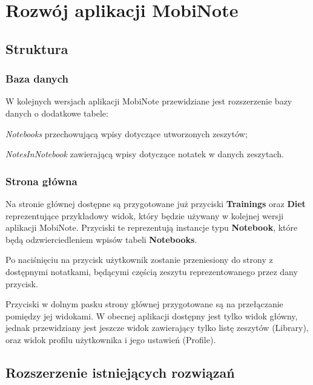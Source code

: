 

\chapter{Rozwój aplikacji MobiNote}
\label{ch:rozwoj}

\section{Struktura}

\subsection{Baza danych}

W kolejnych wersjach aplikacji MobiNote przewidziane jest rozszerzenie bazy danych o dodatkowe tabele:
\begin{compactitem}
    \item \textit{Notebooks} przechowującą wpisy dotyczące utworzonych zeszytów;
    \item \textit{NotesInNotebook} zawierającą wpisy dotyczące notatek w danych zeszytach.
\end{compactitem}

\subsection{Strona główna}

Na stronie głównej dostępne są przygotowane już przyciski \textbf{Trainings} oraz \textbf{Diet} reprezentujące przykładowy widok, który będzie używany w kolejnej wersji aplikacji MobiNote. Przyciski te reprezentują instancje typu \textbf{Notebook}, które będą odzwierciedleniem wpisów tabeli \textbf{Notebooks}.

Po naciśnięciu na przycisk użytkownik zostanie przeniesiony do strony z dostępnymi notatkami, będącymi częścią zeszytu reprezentowanego przez dany przycisk.

Przyciski w dolnym pasku strony głównej przygotowane są na przełączanie pomiędzy jej widokami. W obecnej aplikacji dostępny jest tylko widok główny, jednak przewidziany jest jeszcze widok zawierający tylko listę zeszytów (Library), oraz widok profilu użytkownika i jego ustawień (Profile).

\section{Rozszerzenie istniejących rozwiązań}

